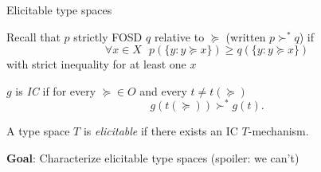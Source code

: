 
\begin{frame}{Elicitable type spaces}{}

Recall that $p$ strictly FOSD $q$ relative to $\succeq$ (written $p\succ^* q$) if
$$\forall x\in X ~~~ p(\{y: y\succeq x\}) \ge q(\{y: y\succeq x\})$$
with strict inequality for at least one $x$

\pause

\smallskip

\begin{definition}
$g$ is \emph{IC} if for every $\succeq\in O$ and every $t\neq t(\succeq)$
$$g(t(\succeq))\succ^* g(t).$$
\end{definition}

\pause


\begin{definition}
A type space $T$ is \emph{elicitable} if there exists an IC $T$-mechanism.
\end{definition}

\bigskip
\smallskip

\textbf{Goal}: Characterize elicitable type spaces (spoiler: we can't)

\end{frame}


%
%
%
%
%
%
%



